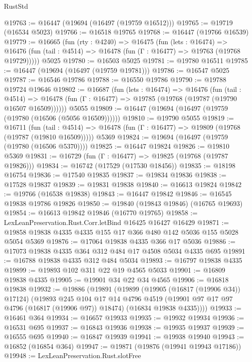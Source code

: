 \begin{lexlean}{RustStd}
\begin{coremodule}
{\begin{coremodule}
{{{{{{{{{{{{{{{{{{{{{{{{{{{{{{{{{{{{{{{{{{{{{{{{{{{{{{{@19763 := @16447 (@19694 (@16497 (@19759 @16512)))
@19765 := @19719 (@16534 @5023)
@19766 := @16518 @19765
@19768 := @16447 (@19766 @16539)
@19779 := @16665
    (fun (rty : @4240) =>
    @16475
      (fun (lets : @16474) =>
      @16476 (fun (tail : @4514) => @16478 (fun (Γ : @16477) => @19763 (@19768 @19729)))))
    @5025
@19780 := @16503 @5025
@19781 := @19780 @16511
@19785 := @16447 (@19694 (@16497 (@19759 @19781)))
@19786 := @16547 @5025
@19787 := @16546 @19786
@19788 := @16550 @19786
@19790 := @19788 @19724 @19646
@19802 := @16687
    (fun (lets : @16474) =>
    @16476
      (fun (tail : @4514) =>
      @16478 (fun (Γ : @16477) => @19785 (@19768 (@19787 (@19790 @16507 @16509))))))
    @5055
@19809 := @16447 (@19694 (@16497 (@19759 (@19780 (@16506 (@5056 @16509))))))
@19810 := @19790 @5055
@19819 := @16711
    (fun (tail : @4514) => @16478 (fun (Γ : @16477) => @19809 (@19768 (@19787 (@19810 @16509)))))
    @5369
@19824 := @19694 (@16497 (@19759 (@19780 (@16506 @5370))))
@19825 := @16447 @19824
@19826 := @19810 @5369
@19831 := @16729 (fun (Γ : @16477) => @19825 (@19768 (@19787 @19826)))
@19834 := @16742 (@17529 (@17530 @18456))
@19835 := @18198 @16754
@19836 := @17540 @19835
@19837 := @19834 @19836
@19838 := @17528 @19837
@19839 := @19831 @19838
@19840 := @16613 @19824
@19842 := @19766 (@16538 @19838)
@19843 := @16447 @19842
@19846 := @16545 @19838 @19786 @19826
@19850 := @19840 (@19843 @19846) (@16765 @19693)
@19854 := @16613 @19842 @19846 (@16770 @19765)
@19858 := LexLeanPreservation.Rust.Corr.letBind @16425 @16427 @16429
@19871 := @19858 @19838 @4335 @4335 @155 @17 @366 @480 @142 @5036 @155 @5028 @5054 @5369
@19876 := @17064 @19838 @4335 @366 @17 @5036
@19886 := @17073 @19838 @4335 @364 @312 @484 @17 @4508 @5034 @4335 @695
@19891 := @16788 @19838 @4335 @312 @484 @5034
@19893 := @16797 @19838 @4335
@19899 := @19893 @102 @311 @22 @19 @4565 @5033
@19901 := @16809 @19838 @4335
@19905 := @19901 @34 @22 @34 @4565
@19906 := @16818 @19838
@19932 := @19886
    (@19891
      (@19899
        (@19905 (@16817 (@19906 @34)) @17124)
        (@19893
          @245
          @104
          @17
          @14
          @4796
          @4519
          (@19901 @97 @17 @97 @4796 (@16817 (@19906 @97)) @18474)
          (@16834 @19838 @4335))))
@19933 := @16461 @364
@19934 := @16657 @19933
@19935 := @19932 @19934
@19936 := @16531 @695
@19937 := @16843 @19936
@19938 := @19935 @19937
@19939 := @16555 @695
@19940 := @16847 @19939
@19941 := @19938 @19940
@19943 := @16852 (@16854 @364)
@19947 := @19871 (@19876 (@19941 @19943 @17186))
@19948 := LexLeanPreservation.Rust.slotFree
}}}}}}}}}}}}}}}}}}}}}}}}}}}}}}}}}}}}}}}}}}}}}}}}}}}}}}}
\end{coremodule}}
\end{coremodule}
\end{lexlean}
